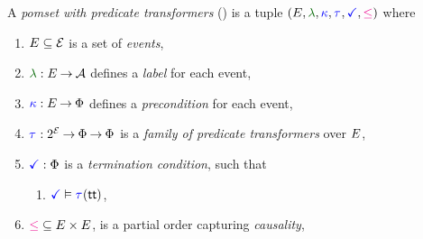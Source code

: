 \begin{definition}
  \label{def:pomset}
  A \emph{pomset with predicate transformers} (\PwT) %
  is a tuple $(\aEvs, \labeling, \labelingForm, \aTr{}{}, \aTerm, {\le})$ where
  \begin{enumerate}[,label=(\textsc{m}\arabic*),ref=\textsc{m}\arabic*]
  \item \label{pom-E} 
    $E\subseteq\mathcal{E}$ is a set of \emph{events},
  \item \label{pom-lambda} 
    $\labeling: \aEvs \fun \Act$ defines a \emph{label} for each event,
  \item \label{pom-kappa} 
    ${\color{blue}\kappa}:E\mathbin\rightarrow\Phi$ defines a \emph{precondition} for each event,
  \item \label{pom-tau} 
    $\aTr{}{}:2^{\AllEvents}\fun\Formulae \fun\Formulae$ is a \emph{family of predicate transformers} over $E$, 
  \item \label{pom-term} 
    $\aTerm:\Formulae$ is a \emph{termination condition}, such that 
    \begin{enumerate}
    \item \label{pom-term-tau}
      $\aTerm\rimplies\aTr{}{\TRUE}$,
    \end{enumerate}
  \item \label{pom-le} 
    ${\le} \subseteq \aEvs\times\aEvs$, is a partial order capturing
    \emph{causality},
  \end{enumerate}

\end{definition}
